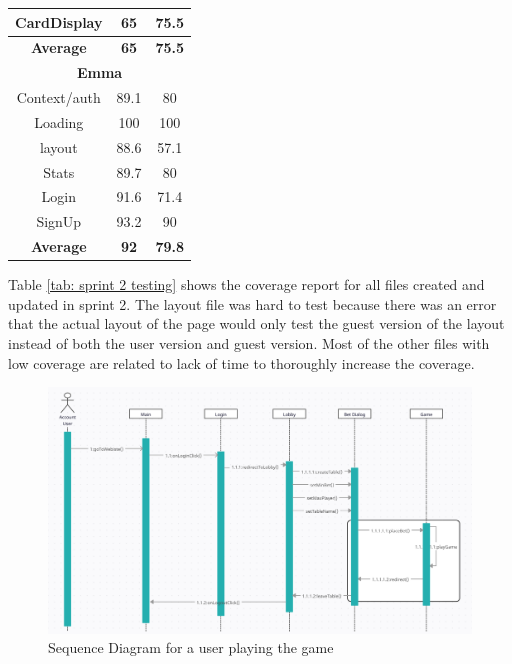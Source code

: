 \begin{table}[!hbt]
\begin{tabular}{|ccc|}
\multicolumn{1}{|c|}{CardDisplay}        & \multicolumn{1}{c|}{65}            & 75.5          \\ \hline
\multicolumn{1}{|c|}{\textbf{Average}}   & \multicolumn{1}{c|}{\textbf{65}}   & \textbf{75.5} \\ \hline
\multicolumn{3}{|c|}{\textbf{Emma}}                                                           \\ \hline
\multicolumn{1}{|c|}{Context/auth}       & \multicolumn{1}{c|}{89.1}          & 80            \\ \hline
\multicolumn{1}{|c|}{Loading}            & \multicolumn{1}{c|}{100}           & 100           \\ \hline
\multicolumn{1}{|c|}{layout}             & \multicolumn{1}{c|}{88.6}          & 57.1          \\ \hline
\multicolumn{1}{|c|}{Stats}              & \multicolumn{1}{c|}{89.7}          & 80            \\ \hline
\multicolumn{1}{|c|}{Login}              & \multicolumn{1}{c|}{91.6}          & 71.4          \\ \hline
\multicolumn{1}{|c|}{SignUp}             & \multicolumn{1}{c|}{93.2}          & 90            \\ \hline
\multicolumn{1}{|c|}{\textbf{Average}}   & \multicolumn{1}{c|}{\textbf{92}}   & \textbf{79.8} \\ \hline
\end{tabular}
\end{table}

\noindent Table \ref{tab: sprint 2 testing} shows the coverage report for all files created and updated in sprint 2. The layout file was hard to test because there was an error that the actual layout of the page would only test the guest version of the layout instead of both the user version and guest version. Most of the other files with low coverage are related to lack of time to thoroughly increase the coverage.

\pagebreak


\begin{figure}[!hbt]
    \centering
    \includegraphics[width=1.0\linewidth]{figures/sequence.png}
    \caption{Sequence Diagram for a user playing the game}
    \label{fig:sequence}
\end{figure}

